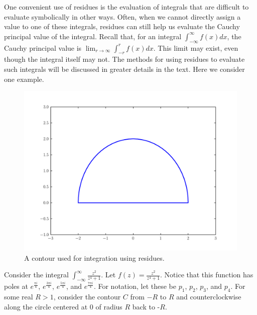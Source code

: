 One convenient use of residues is the evaluation of integrals that are difficult to evaluate symbolically in other ways.
Often, when we cannot directly assign a value to one of these integrals, residues can still help us evaluate the Cauchy principal value of the integral.
Recall that, for an integral $\int_{-\infty}^{\infty} f(x)dx$, the Cauchy principal value is $\lim_{r\to \infty} \int_{-r}^{r} f(x) dx$.
This limit may exist, even though the integral itself may not.
The methods for using residues to evaluate such integrals will be discussed in greater details in the text.
Here we consider one example.

\begin{figure}
\includegraphics[width=\textwidth]{contour1.pdf}
\caption{A contour used for integration using residues.}
\label{complexint:c1}
\end{figure}

Consider the integral $\int_{-\infty}^{\infty}\frac{z^2}{z^4+1}$. Let $f(z)=\frac{z^2}{z^4+1}$.
Notice that this function has poles at $e^{\frac{\pi i}{4}}$, $e^{\frac{3\pi i}{4}}$, $e^{\frac{5\pi i}{4}}$, and $e^{\frac{7\pi i}{4}}$.
For notation, let these be $p_1$, $p_2$, $p_3$, and $p_4$.
For some real $R>1$, consider the contour $C$ from $-R$ to $R$ and counterclockwise along the circle centered at $0$ of radius $R$ back to -$R$.

